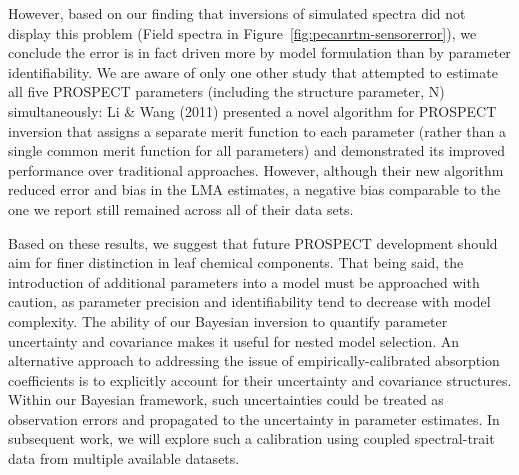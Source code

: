 However, based on our finding that inversions of simulated spectra did not display this problem (Field spectra in Figure~\ref{fig:pecanrtm-sensorerror}), we conclude the error is in fact driven more by model formulation than by parameter identifiability. %
We are aware of only one other study that attempted to estimate all five PROSPECT parameters (including the structure parameter, N) simultaneously: \nocite{li_2011_retrieval}
Li \& Wang (2011) presented a novel algorithm for PROSPECT inversion that assigns a separate merit function to each parameter (rather than a single common merit function for all parameters) and demonstrated its improved performance over traditional approaches.
However, although their new algorithm reduced error and bias in the LMA estimates, a negative bias comparable to the one we report still remained across all of their data sets. 

Based on these results, we suggest that future PROSPECT development should aim for finer distinction in leaf chemical components.
That being said, the introduction of additional parameters into a model must be approached with caution, as parameter precision and identifiability tend to decrease with model complexity.
The ability of our Bayesian inversion to quantify parameter uncertainty and covariance makes it useful for nested model selection.
An alternative approach to addressing the issue of empirically-calibrated absorption coefficients is to explicitly account for their uncertainty and covariance structures. 
Within our Bayesian framework, such uncertainties could be treated as observation errors and propagated to the uncertainty in parameter estimates.
In subsequent work, we will explore such a calibration using coupled spectral-trait data from multiple available datasets.

